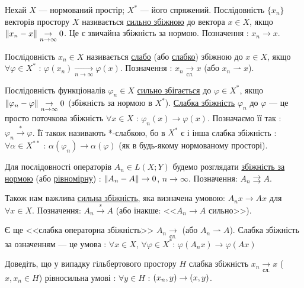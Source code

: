 
\begin{theory}
    Нехай $X$ --- нормований простір; $X^*$ --- його спряжений. Послідовність $\{x_n\}$ 
    векторів простору $X$ називається \ul{сильно збіжною} до вектора $x \in X$, якщо 
    $\left\lVert x_n - x\right\rVert \underset{n \rightarrow \infty}{\rightarrow} 0$. Це є звичайна збіжність 
    за нормою. Позначення : $x_n \rightarrow x$.

    Послідовність $x_n \in X$ називається \ul{слабо} (або \ul{слабко}) збіжною до $x \in X$, 
    якщо $\forall \varphi \in X^*$ : $\varphi(x_n) \underset{n \rightarrow \infty}{\rightarrow} 
    \varphi(x)$. Позначення : $x_n \underset{\text{сл.}}{\rightarrow} x$ 
    (або $x_n \rightharpoonup x$).

    Послідовність функціоналів $\varphi_n \in X$ \ul{сильно збігається} до $\varphi \in X^*$, 
    якщо $\left\lVert\varphi_n - \varphi\right\rVert \underset{n \rightarrow \infty}{\rightarrow} 0$ 
    (збіжність за нормою в $X^*$). \ul{Слабка збіжність} $\varphi_n$ до $\varphi$ --- 
    це просто поточкова збіжність  $\forall x \in X$ : $\varphi_n(x) \rightarrow \varphi(x)$.
    Позначаємо її так : $\varphi_n \overset{*}{\rightarrow} \varphi$. 
    Її також називають *-слабкою, бо в $X^*$ є і інша слабка збіжність : $\forall \alpha 
    \in X^{**}$ : $\alpha(\varphi_n) \rightarrow \alpha(\varphi)$ (як в будь-якому 
    нормованому просторі).

    Для послідовності операторів $A_n \in L(X; Y)$ будемо розглядати \ul{збіжність за нормою} 
    (або \ul{рівномірну}) : $\left\lVert A_n - A\right\rVert \rightarrow 0$, $n \rightarrow \infty$. 
    Позначення: $A_n \rightrightarrows A$.

    Також нам важлива \ul{сильна збіжність}, яка визначена умовою: 
    $A_n x \rightarrow Ax$ для $\forall x \in X$. Позначення: $A_n \overset{s}{\rightarrow} A$ 
    (або інакше: <<$A_n \rightarrow A$ сильно>>).

    Є ще <<слабка операторна збіжність>> $A_n \underset{\text{сл.}}{\rightarrow}$ 
    (або $A_n \rightharpoonup A$). Слабка збіжність за означенням --- це умова : 
    $\forall x \in X$, $\forall \varphi \in X^*$: $\varphi(A_nx) \rightarrow \varphi(Ax)$
\end{theory}

\begin{exercise}
    Доведіть, що у випадку гільбертового простору $H$ слабка збіжність $x_n 
    \underset{\text{сл.}}{\rightarrow} x$ ($x, x_n \in H$) рівносильна умові : 
    $\forall y \in H$ : $\left(x_n, y\right) \rightarrow \left(x, y\right)$.
\end{exercise}


